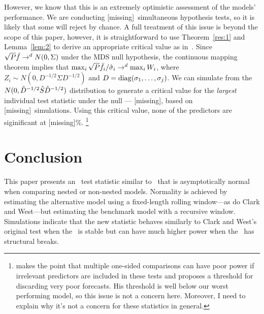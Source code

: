\documentclass[12pt,fleqn]{article}
\providecommand\bootsize{[missing]}
\providecommand\empiricalcriticalvalue{[missing]}
\providecommand\nmod{[missing]}
\providecommand\empiricaldraws{[missing]}
\begin{document}
However, we know that this is an extremely optimistic assessment of
the models' performance. We are conducting \nmod\ simultaneous
hypothesis tests, so it is likely that some will reject by chance. A
full treatment of this issue is beyond the scope of this paper,
however, it is straightforward to use Theorem~\ref{res:1} and
Lemma~\ref{lem:2} to derive an appropriate critical value as
in~\citet{Whi:00}. Since $\sqrt{P} \bar{f} \to^d N(0, \Sigma)$ under
the MDS null hypothesis, the continuous mapping theorem implies that
$\max_i \sqrt{P} \bar{f}_i/\hat\sigma_i \to^d \max_i W_i$, where $Z_i
\sim N(0, D^{-1/2} \Sigma D^{-1/2})$ and $D = \operatorname{diag}(\sigma_1, \dots,
\sigma_j)$. We can simulate from the $N(0, \hat D^{-1/2} \hat{S}
\hat D^{-1/2})$ distribution to generate a critical value for the
\emph{largest} individual test statistic under the null ---
\empiricalcriticalvalue, based on \empiricaldraws\ simulations. Using
this critical value, none of the predictors are siginificant at
\bootsize\%.%
\footnote{\citet{Han:05} makes the point that multiple one-sided
  comparisons can have poor power if irrelevant predictors are
  included in these tests and proposes a threshold for discarding very
  poor forecasts. His threshold is well below our worst performing
  model, so this issue is not a concern here. Moreover, I need to
  explain why it's not a concern for these statistics in general.} %

\section{Conclusion}\label{sec:4}
This paper presents an \oos\ test statistic similar to \poscw\ that is
asymptotically normal when comparing nested or non-nested models.
Normality is achieved by estimating the alternative model using a
fixed-length rolling window---as do Clark and West---but estimating
the benchmark model with a recursive window.  Simulations indicate
that the new statistic behaves similarly to Clark and West's original
test when the \dgp\ is stable but can have much higher power when the
\dgp\ has structural breaks.


\end{document}
